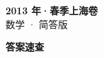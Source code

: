 \documentclass[zihao=-4, a4paper]{ctexart}
\begin{document}
\begin{center}
  {\Large\bfseries 2013 年·春季上海卷}\\[4pt]
  {\large 数学 · 简答版}
\end{center}
\medskip
{}

\clearpage
{}
\begin{center}{\Large\bfseries 答案速查}\end{center}
\medskip

\end{document}
